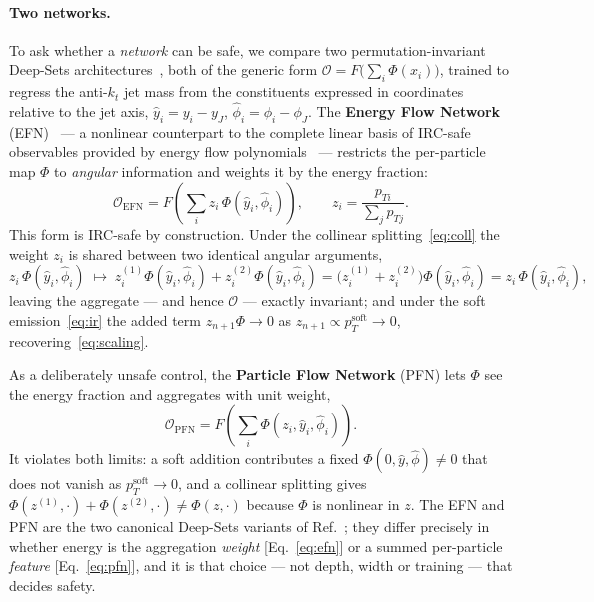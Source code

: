 \documentclass[11pt]{article}
\newcommand{\kt}{k_{t}}
\newcommand{\antikt}{anti-$\kt$}
\newcommand{\ptsoft}{p_{T}^{\mathrm{soft}}}
\newcommand{\Obs}{\mathcal{O}}
\begin{document}
\paragraph{Two networks.}
To ask whether a \emph{network} can be safe, we compare two permutation-invariant Deep-Sets
architectures~\cite{deepsets}, both of the generic form $\Obs = F\!\big(\sum_i\Phi(x_i)\big)$,
trained to regress the \antikt{} jet mass from the constituents expressed in coordinates
relative to the jet axis, $\hat y_i = y_i - y_J$, $\hat\phi_i = \phi_i - \phi_J$. The
\textbf{Energy Flow Network} (EFN)~\cite{efn} --- a nonlinear counterpart to the complete
linear basis of IRC-safe observables provided by energy flow polynomials~\cite{efp} ---
restricts the per-particle map $\Phi$ to
\emph{angular} information and weights it by the energy fraction:
\begin{equation}
\Obs_{\mathrm{EFN}} = F\!\left(\sum_{i} z_i\,\Phi(\hat y_i,\hat\phi_i)\right),
\qquad
z_i = \frac{p_{Ti}}{\sum_{j} p_{Tj}} .
\label{eq:efn}
\end{equation}
This form is IRC-safe by construction. Under the collinear splitting~\eqref{eq:coll} the
weight $z_i$ is shared between two identical angular arguments,
\begin{equation}
z_i\,\Phi(\hat y_i,\hat\phi_i)\;\longmapsto\;
z_i^{(1)}\Phi(\hat y_i,\hat\phi_i) + z_i^{(2)}\Phi(\hat y_i,\hat\phi_i)
= \big(z_i^{(1)}+z_i^{(2)}\big)\Phi(\hat y_i,\hat\phi_i)
= z_i\,\Phi(\hat y_i,\hat\phi_i),
\label{eq:efncoll}
\end{equation}
leaving the aggregate --- and hence $\Obs$ --- exactly invariant; and under the soft
emission~\eqref{eq:ir} the added term $z_{n+1}\Phi\to0$ as $z_{n+1}\propto\ptsoft\to0$,
recovering~\eqref{eq:scaling}.

As a deliberately unsafe control, the \textbf{Particle Flow Network} (PFN) lets $\Phi$ see
the energy fraction and aggregates with unit weight,
\begin{equation}
\Obs_{\mathrm{PFN}} = F\!\left(\sum_{i}\Phi(z_i,\hat y_i,\hat\phi_i)\right).
\label{eq:pfn}
\end{equation}
It violates both limits: a soft addition contributes a fixed
$\Phi(0,\hat y,\hat\phi)\neq0$ that does not vanish as $\ptsoft\to0$, and a collinear
splitting gives $\Phi(z^{(1)}\!,\cdot)+\Phi(z^{(2)}\!,\cdot)\neq\Phi(z,\cdot)$ because
$\Phi$ is nonlinear in $z$. The EFN and PFN are the two canonical Deep-Sets variants of
Ref.~\cite{efn}; they differ precisely in whether energy is the aggregation \emph{weight}
[Eq.~\eqref{eq:efn}] or a summed per-particle \emph{feature} [Eq.~\eqref{eq:pfn}], and it is
that choice --- not depth, width or training --- that decides safety.
\end{document}
